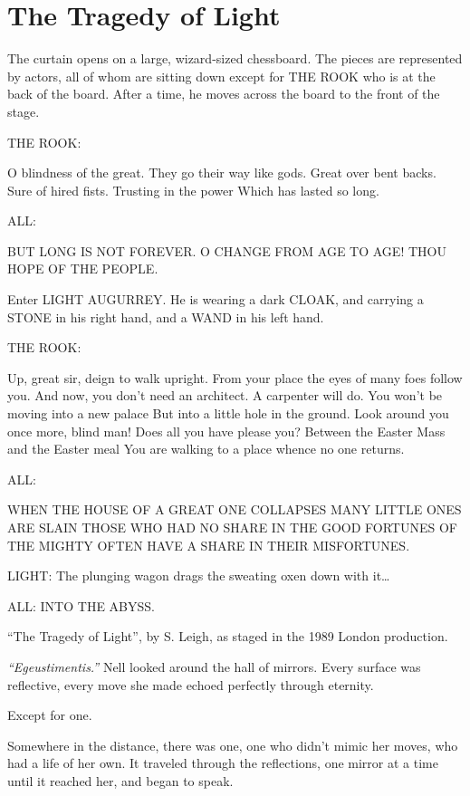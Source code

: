 \chapter{The Tragedy of Light}
The curtain opens on a large, wizard-sized chessboard. The pieces are represented by actors, all of whom are sitting down except for THE ROOK who is at the back of the board. After a time, he moves across the board to the front of the stage. 

THE ROOK: 

O blindness of the great.
They go their way like gods.
Great over bent backs.
Sure of hired fists.
Trusting in the power
Which has lasted so long.

ALL:

BUT LONG IS NOT FOREVER.
O CHANGE FROM AGE TO AGE!
THOU HOPE OF THE PEOPLE.

Enter LIGHT AUGURREY. He is wearing a dark CLOAK, and carrying a STONE in his right hand, and a WAND in his left hand.

THE ROOK: 

Up, great sir, deign to walk upright.
From your place the eyes of many foes follow you.
And now, you don’t need an architect. A carpenter will do.
You won’t be moving into a new palace
But into a little hole in the ground.
Look around you once more, blind man!
Does all you have please you?
Between the Easter Mass and the Easter meal
You are walking to a place whence no one returns.

ALL: 

WHEN THE HOUSE OF A GREAT ONE COLLAPSES
MANY LITTLE ONES ARE SLAIN
THOSE WHO HAD NO SHARE IN THE GOOD FORTUNES OF THE MIGHTY
OFTEN HAVE A SHARE IN THEIR MISFORTUNES.

LIGHT: The plunging wagon drags the sweating oxen down with it…

ALL: INTO THE ABYSS.

“The Tragedy of Light”, by S. Leigh, as staged in the 1989 London production.
\simpleline
{}

\emph{“Egeustimentis.”}
Nell looked around the hall of mirrors. Every surface was reflective, every move she made echoed perfectly through eternity.

Except for one.

Somewhere in the distance, there was one, one who didn’t mimic her moves, who had a life of her own. It traveled through the reflections, one mirror at a time until it reached her, and began to speak.

